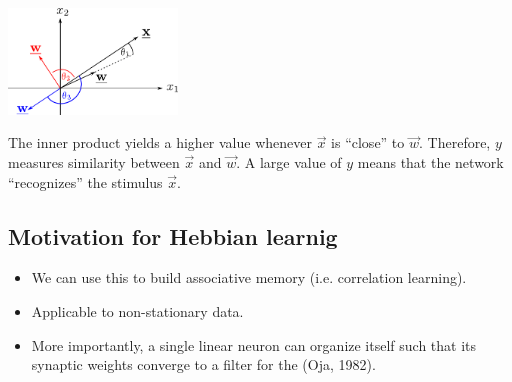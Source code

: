 \begin{frame}{\secname}
\begin{itemize}
{\begin{center}
\includegraphics[width=4.5cm]{img/wxangle}
\end{center}

The inner product yields a higher value whenever $\vec x$ is ``close'' to $\vec w$.
Therefore, $y$ measures similarity between $\vec x$ and $\vec w$.
A large value of $y$ means that the network ``recognizes'' the stimulus $\vec x$.
}
\end{itemize}

\end{frame}

\newpage

\subsection{Motivation for Hebbian learnig}

\begin{frame}{\subsecname}

\begin{itemize}
\item We can use this to build associative memory (i.e. correlation learning).
\item Applicable to non-stationary data.
\item More importantly, a single linear neuron 
can organize itself such that its synaptic weights converge to a filter 
for the  (Oja, 1982).

\pause


\end{itemize}

\end{frame}

